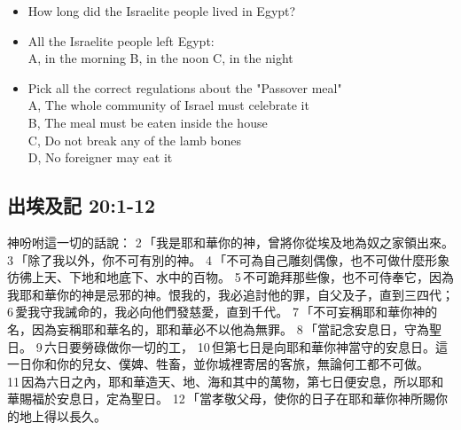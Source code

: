 \begin{itemize}
\item How long did the Israelite people lived in Egypt?
\item All the Israelite people left Egypt: \\
A, in the morning \hspace{1cm}  B, in the noon \hspace{1cm}       C, in the night 
\item Pick all the correct regulations about the "Passover meal"\\
A, The whole community of Israel must celebrate it\\
B, The meal must be eaten inside the house\\
C, Do not break any of the lamb bones\\
D, No foreigner may eat it\\
\end{itemize}


\subsection{出埃及記 20:1-12}

神吩咐這一切的話說： 2 「我是耶和華你的神，曾將你從埃及地為奴之家領出來。
3 「除了我以外，你不可有別的神。
4 「不可為自己雕刻偶像，也不可做什麼形象彷彿上天、下地和地底下、水中的百物。 5 不可跪拜那些像，也不可侍奉它，因為我耶和華你的神是忌邪的神。恨我的，我必追討他的罪，自父及子，直到三四代； 6 愛我守我誡命的，我必向他們發慈愛，直到千代。
7 「不可妄稱耶和華你神的名，因為妄稱耶和華名的，耶和華必不以他為無罪。
8 「當記念安息日，守為聖日。 9 六日要勞碌做你一切的工， 10 但第七日是向耶和華你神當守的安息日。這一日你和你的兒女、僕婢、牲畜，並你城裡寄居的客旅，無論何工都不可做。 11 因為六日之內，耶和華造天、地、海和其中的萬物，第七日便安息，所以耶和華賜福於安息日，定為聖日。
12 「當孝敬父母，使你的日子在耶和華你神所賜你的地上得以長久。

